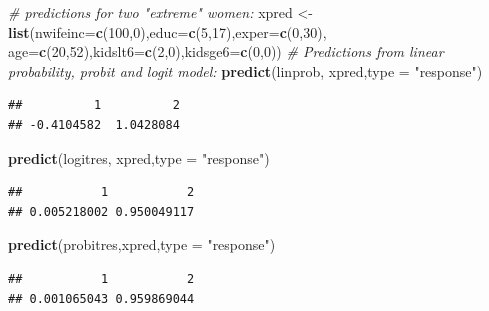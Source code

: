\documentclass[]{book}
\newenvironment{Shaded}{\begin{snugshade}}{\end{snugshade}}
\newcommand{\CommentTok}[1]{\textcolor[rgb]{0.56,0.35,0.01}{\textit{#1}}}
\newcommand{\DataTypeTok}[1]{\textcolor[rgb]{0.13,0.29,0.53}{#1}}
\newcommand{\DecValTok}[1]{\textcolor[rgb]{0.00,0.00,0.81}{#1}}
\newcommand{\KeywordTok}[1]{\textcolor[rgb]{0.13,0.29,0.53}{\textbf{#1}}}
\newcommand{\NormalTok}[1]{#1}
\newcommand{\StringTok}[1]{\textcolor[rgb]{0.31,0.60,0.02}{#1}}
\begin{document}
\begin{Shaded}
\begin{Highlighting}[]
\CommentTok{# predictions for two "extreme" women:}
\NormalTok{xpred <-}\StringTok{ }\KeywordTok{list}\NormalTok{(}\DataTypeTok{nwifeinc=}\KeywordTok{c}\NormalTok{(}\DecValTok{100}\NormalTok{,}\DecValTok{0}\NormalTok{),}\DataTypeTok{educ=}\KeywordTok{c}\NormalTok{(}\DecValTok{5}\NormalTok{,}\DecValTok{17}\NormalTok{),}\DataTypeTok{exper=}\KeywordTok{c}\NormalTok{(}\DecValTok{0}\NormalTok{,}\DecValTok{30}\NormalTok{),}
              \DataTypeTok{age=}\KeywordTok{c}\NormalTok{(}\DecValTok{20}\NormalTok{,}\DecValTok{52}\NormalTok{),}\DataTypeTok{kidslt6=}\KeywordTok{c}\NormalTok{(}\DecValTok{2}\NormalTok{,}\DecValTok{0}\NormalTok{),}\DataTypeTok{kidsge6=}\KeywordTok{c}\NormalTok{(}\DecValTok{0}\NormalTok{,}\DecValTok{0}\NormalTok{))}
\CommentTok{# Predictions from linear probability, probit and logit model:}
\KeywordTok{predict}\NormalTok{(linprob,  xpred,}\DataTypeTok{type =} \StringTok{"response"}\NormalTok{)}
\end{Highlighting}
\end{Shaded}

\begin{verbatim}
##          1          2 
## -0.4104582  1.0428084
\end{verbatim}

\begin{Shaded}
\begin{Highlighting}[]
\KeywordTok{predict}\NormalTok{(logitres, xpred,}\DataTypeTok{type =} \StringTok{"response"}\NormalTok{)}
\end{Highlighting}
\end{Shaded}

\begin{verbatim}
##           1           2 
## 0.005218002 0.950049117
\end{verbatim}

\begin{Shaded}
\begin{Highlighting}[]
\KeywordTok{predict}\NormalTok{(probitres,xpred,}\DataTypeTok{type =} \StringTok{"response"}\NormalTok{)}
\end{Highlighting}
\end{Shaded}

\begin{verbatim}
##           1           2 
## 0.001065043 0.959869044
\end{verbatim}
\end{document}
